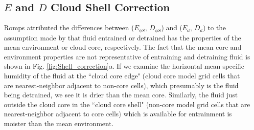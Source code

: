 \documentclass[12pt]{article}
\begin{document}

\subsection{$E$ and $D$ Cloud Shell Correction}

Romps attributed the differences between ($E_{\phi S}$, $D_{\phi S}$)
and ($E_d$, $D_d$) to the assumption made by \cite{Siebesma1995} that
fluid entrained or detrained has the properties of the mean
environment or cloud core, respectively.  The fact that the mean core
and environment properties are not representative of entraining and
detraining fluid is shown in Fig. \ref{fig:Shell_correction}a. If we
examine the horizontal mean specific humidity of the fluid at the ``cloud core 
edge" (cloud core model grid cells that are nearest-neighbor adjacent to
non-core cells), which presumably is the fluid being detrained, we see
it is drier than the mean core.  Similarly, the fluid just outside the
cloud core in the ``cloud core shell" (non-core model grid cells that
are nearest-neighbor adjacent to core cells) which is available for
entrainment is moister than the mean environment.
\end{document}
